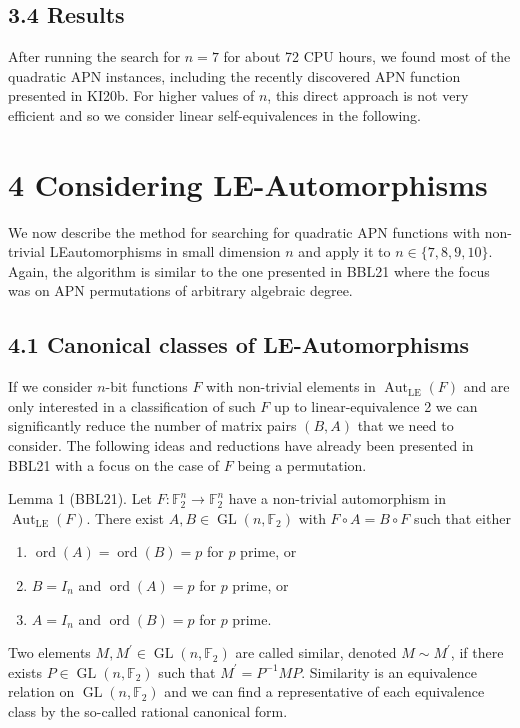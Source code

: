 \documentclass[10pt]{article}
\begin{document}
\subsection*{3.4 Results}
After running the search for $n=7$ for about 72 CPU hours, we found most of the quadratic APN instances, including the recently discovered APN function presented in KI20b. For higher values of $n$, this direct approach is not very efficient and so we consider linear self-equivalences in the following.

\section*{4 Considering LE-Automorphisms}
We now describe the method for searching for quadratic APN functions with non-trivial LEautomorphisms in small dimension $n$ and apply it to $n \in\{7,8,9,10\}$. Again, the algorithm is similar to the one presented in BBL21 where the focus was on APN permutations of arbitrary algebraic degree.

\subsection*{4.1 Canonical classes of LE-Automorphisms}
If we consider $n$-bit functions $F$ with non-trivial elements in $\operatorname{Aut}_{\mathrm{LE}}(F)$ and are only interested in a classification of such $F$ up to linear-equivalence 2 we can significantly reduce the number of matrix pairs $(B, A)$ that we need to consider. The following ideas and reductions have already been presented in BBL21 with a focus on the case of $F$ being a permutation.

Lemma 1 (BBL21). Let $F: \mathbb{F}_{2}^{n} \rightarrow \mathbb{F}_{2}^{n}$ have a non-trivial automorphism in $\operatorname{Aut}_{\mathrm{LE}}(F)$. There exist $A, B \in \operatorname{GL}\left(n, \mathbb{F}_{2}\right)$ with $F \circ A=B \circ F$ such that either

\begin{enumerate}
  \item $\operatorname{ord}(A)=\operatorname{ord}(B)=p$ for $p$ prime, or
  \item $B=I_{n}$ and $\operatorname{ord}(A)=p$ for $p$ prime, or
  \item $A=I_{n}$ and $\operatorname{ord}(B)=p$ for $p$ prime.
\end{enumerate}

Two elements $M, M^{\prime} \in \operatorname{GL}\left(n, \mathbb{F}_{2}\right)$ are called similar, denoted $M \sim M^{\prime}$, if there exists $P \in \operatorname{GL}\left(n, \mathbb{F}_{2}\right)$ such that $M^{\prime}=P^{-1} M P$. Similarity is an equivalence relation on $\operatorname{GL}\left(n, \mathbb{F}_{2}\right)$ and we can find a representative of each equivalence class by the so-called rational canonical form.
\end{document}

